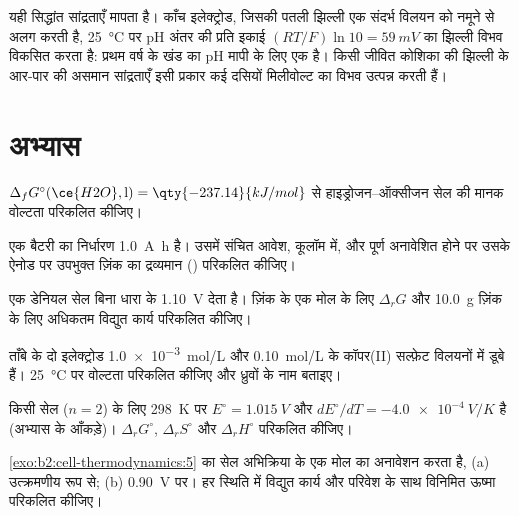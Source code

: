 यही सिद्धांत सांद्रताएँ मापता है। काँच इलेक्ट्रोड, जिसकी पतली
झिल्ली एक संदर्भ विलयन को नमूने से अलग करती है, \qty{25}{\degreeCelsius} पर
pH अंतर की प्रति इकाई $(RT/F)\ln 10 = \qty{59}{mV}$ का झिल्ली
विभव विकसित करता है: प्रथम वर्ष के खंड का pH मापी  के लिए एक  है।
किसी जीवित कोशिका की झिल्ली के आर-पार  की असमान सांद्रताएँ
इसी प्रकार कई दसियों मिलीवोल्ट का विभव उत्पन्न करती हैं।

\section{अभ्यास}

\begin{exercise}[$\star$]\label{exo:b2:cell-thermodynamics:1}
$\Delta_f G^\circ(\ce{H2O}, \text{l}) = \qty{-237.14}{kJ/mol}$ से
हाइड्रोजन--ऑक्सीजन सेल की मानक वोल्टता परिकलित कीजिए।
\end{exercise}

\begin{exercise}[$\star$]\label{exo:b2:cell-thermodynamics:2}
एक बैटरी का निर्धारण \qty{1.0}{A.h} है। उसमें संचित आवेश, कूलॉम में,
और पूर्ण अनावेशित होने पर उसके ऐनोड पर उपभुक्त ज़िंक का द्रव्यमान ()
परिकलित कीजिए।
\end{exercise}

\begin{exercise}[$\star$]\label{exo:b2:cell-thermodynamics:3}
एक डेनियल सेल बिना धारा के \qty{1.10}{V} देता है। ज़िंक के एक मोल के लिए $\Delta_r G$
और \qty{10.0}{g} ज़िंक के लिए अधिकतम विद्युत कार्य परिकलित कीजिए।
\end{exercise}

\begin{exercise}[$\star$]\label{exo:b2:cell-thermodynamics:4}
ताँबे के दो इलेक्ट्रोड \qty{1.0e-3}{mol/L} और \qty{0.10}{mol/L} के कॉपर(II) सल्फ़ेट
विलयनों में डूबे हैं। \qty{25}{\degreeCelsius} पर वोल्टता परिकलित कीजिए और
ध्रुवों के नाम बताइए।
\end{exercise}

\begin{exercise}[$\star\star$]\label{exo:b2:cell-thermodynamics:5}
किसी सेल ($n = 2$) के लिए \qty{298}{K} पर $E^\circ = \qty{1.015}{V}$ और $dE^\circ/dT = \qty{-4.0e-4}{V/K}$
है (अभ्यास के आँकड़े)। $\Delta_r G^\circ$, $\Delta_r S^\circ$ और
$\Delta_r H^\circ$ परिकलित कीजिए।
\end{exercise}

\begin{exercise}[$\star\star$]\label{exo:b2:cell-thermodynamics:6}
\cref{exo:b2:cell-thermodynamics:5} का सेल अभिक्रिया के एक मोल का अनावेशन करता है,
(a) उत्क्रमणीय रूप से; (b) \qty{0.90}{V} पर। हर स्थिति में विद्युत कार्य और
परिवेश के साथ विनिमित ऊष्मा परिकलित कीजिए।
\end{exercise}

